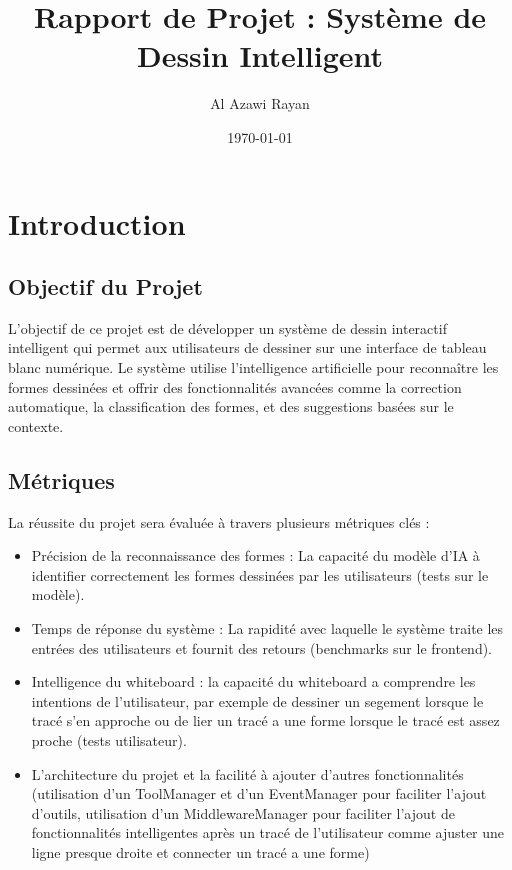 \documentclass[12pt]{article}
\title{Rapport de Projet : Système de Dessin Intelligent}
\author{Al Azawi Rayan}
\date{\today}
\begin{document}
\maketitle


\section{Introduction}

\subsection{Objectif du Projet}

L'objectif de ce projet est de développer un système de dessin interactif intelligent qui permet aux utilisateurs de dessiner sur une interface de tableau blanc numérique. Le système utilise l'intelligence artificielle pour reconnaître les formes dessinées et offrir des fonctionnalités avancées comme la correction automatique, la classification des formes, et des suggestions basées sur le contexte.

\subsection{Métriques}

La réussite du projet sera évaluée à travers plusieurs métriques clés :
\begin{itemize}
  \setlength\itemsep{1em}
  \item Précision de la reconnaissance des formes : La capacité du modèle d'IA à identifier correctement les formes dessinées par les utilisateurs (tests sur le modèle).
  \item Temps de réponse du système : La rapidité avec laquelle le système traite les entrées des utilisateurs et fournit des retours (benchmarks sur le frontend).
  \item Intelligence du whiteboard : la capacité du whiteboard a comprendre les intentions de l'utilisateur, par exemple de dessiner un segement lorsque le tracé s'en approche ou de lier un tracé a une forme lorsque le tracé est assez proche (tests utilisateur).
  \item L'architecture du projet et la facilité à ajouter d'autres fonctionnalités (utilisation d'un ToolManager et d'un EventManager pour faciliter l'ajout d'outils, utilisation d'un MiddlewareManager pour faciliter l'ajout de fonctionnalités intelligentes après un tracé de l'utilisateur comme ajuster une ligne presque droite et connecter un tracé a une forme)
\end{itemize}
\end{document}
